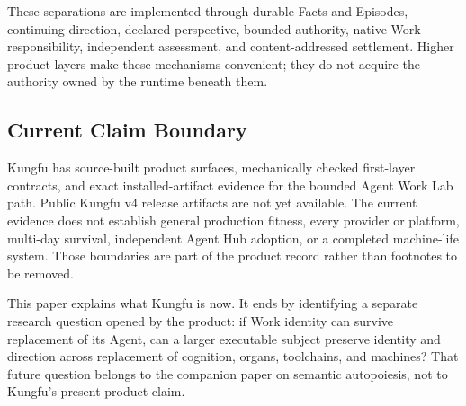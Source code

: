 These separations are implemented through durable Facts and Episodes,
continuing direction, declared perspective, bounded authority, native Work
responsibility, independent assessment, and content-addressed settlement.
Higher product layers make these mechanisms convenient; they do not acquire
the authority owned by the runtime beneath them.

\subsection{Current Claim Boundary}

Kungfu has source-built product surfaces, mechanically checked first-layer
contracts, and exact installed-artifact evidence for the bounded Agent Work
Lab path. Public Kungfu v4 release artifacts are not yet available. The
current evidence does not establish general production fitness, every provider
or platform, multi-day survival, independent Agent Hub adoption, or a completed
machine-life system. Those boundaries are part of the product record rather
than footnotes to be removed.

This paper explains what Kungfu is now. It ends by identifying a separate
research question opened by the product: if Work identity can survive
replacement of its Agent, can a larger executable subject preserve identity
and direction across replacement of cognition, organs, toolchains, and
machines? That future question belongs to the companion paper on semantic
autopoiesis, not to Kungfu's present product claim.
